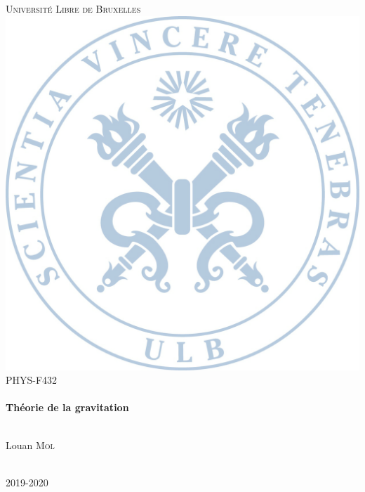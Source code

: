 \begin{titlepage}

    \center
    
    \textsc{\LARGE Université Libre de Bruxelles}\\[1.5cm]
    \includegraphics[scale=.1]{Pictures/background.png}\\[0.5cm]
    \textsc{\large PHYS-F432}\\[0.5cm]
    
    
    \HRule \\[0.6cm]
    {\huge \bfseries Théorie de la gravitation}\\[0.4cm]
    \HRule \\[1.5cm]
    
    
    \begin{minipage}{0.4\textwidth}
    \begin{center} \large
    Louan \textsc{Mol}
    \end{center}
    
    \end{minipage}\\[8cm]
    
    {\large 2019-2020}\\[2cm]
    
    \vfill

\end{titlepage}